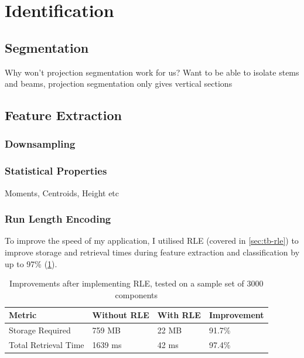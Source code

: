 \section{Identification}
\label{sec:identification}
\subsection{Segmentation}


Why won't projection segmentation work for us? Want to be able to isolate stems and beams, projection segmentation only gives vertical sections


\subsection{Feature Extraction}

\subsubsection{Downsampling}


\subsubsection{Statistical Properties}
\label{sec:statistical-properties}


Moments, Centroids, Height etc

\subsubsection{Run Length Encoding}\label{sec:identification-rle}
To improve the speed of my application, I utilised \acrfull{RLE} (covered in \cref{sec:tb-rle}) to improve storage and retrieval times during feature extraction and classification by up to 97\% (\cref{table:rle-improvement}).

\begin{table}[h]

    \begin{tabularx}{\textwidth}{ X X X X }
    \toprule
    Metric                  & Without RLE   & With RLE   & Improvement \\
    \midrule
    Storage Required        & 759 MB        & 22 MB      & 91.7\%      \\
    Total Retrieval Time    & 1639 ms       & 42 ms      & 97.4\% \\
    \bottomrule
    \end{tabularx}

    \label{table:rle-improvement}
    \caption{Improvements after implementing RLE, tested on a sample set of 3000 components}
\end{table}

